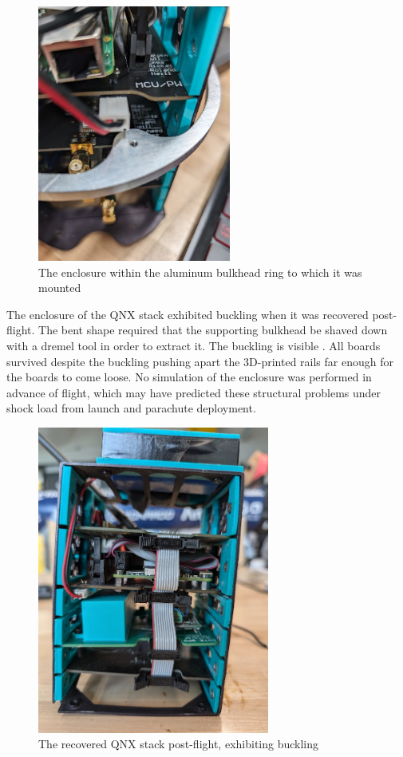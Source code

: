 \begin{figure}[H]
    \center
    \includegraphics[width=2.5in]{assets/images/stack-bulkhead.jpg}
    \caption{The enclosure within the aluminum bulkhead ring to which it was mounted}
    \label{fig:stack-bulkhead}
\end{figure}

The enclosure of the QNX stack exhibited buckling when it was recovered post-flight. The bent shape required that the supporting bulkhead be shaved down with a dremel tool in order to extract it. The buckling is visible . All boards survived despite the buckling pushing apart the 3D-printed rails far enough for the boards to come loose. No simulation of the enclosure was performed in advance of flight, which may have predicted these structural problems under shock load from launch and parachute deployment.

\begin{figure}[H]
    \center
    \includegraphics[width=3in]{assets/images/bent-stack.jpg}
    \caption{The recovered QNX stack post-flight, exhibiting buckling}
    \label{fig:stack-bent}
\end{figure}

